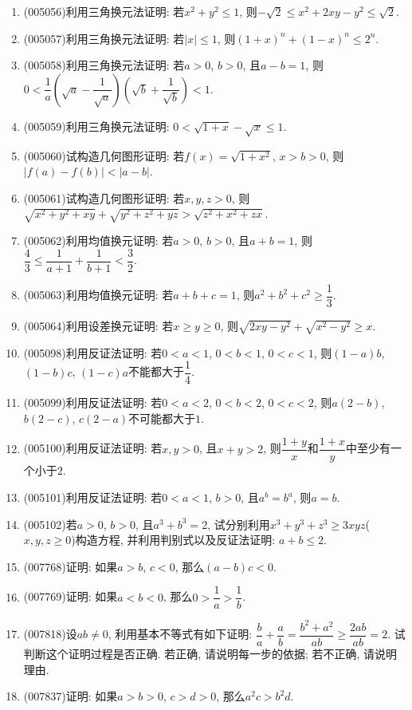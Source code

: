 \documentclass[10pt,a4paper]{article}
\begin{document}
\begin{enumerate}[1.]
\item {\tiny (005056)}利用三角换元法证明: 若$x^2+y^2\le 1$, 则$-\sqrt 2\le x^2+2xy-y^2\le \sqrt 2$.
\item {\tiny (005057)}利用三角换元法证明: 若$|x|\le 1$, 则$(1+x)^n+(1-x)^n\le 2^n$.
\item {\tiny (005058)}利用三角换元法证明: 若$a>0$, $b>0$, 且$a-b=1$, 则$0<\dfrac 1a(\sqrt a-\dfrac 1{\sqrt a})(\sqrt b+\dfrac 1{\sqrt b})<1$.
\item {\tiny (005059)}利用三角换元法证明: $0<\sqrt{1+x}-\sqrt x\le 1$.
\item {\tiny (005060)}试构造几何图形证明: 若$f(x)=\sqrt{1+x^2}$, $x>b>0$, 则$|f(a)-f(b)|<|a-b|$.
\item {\tiny (005061)}试构造几何图形证明: 若$x,y,z>0$, 则$\sqrt{x^2+y^2+xy}+\sqrt{y^2+z^2+yz}>\sqrt{z^2+x^2+zx}$.
\item {\tiny (005062)}利用均值换元证明: 若$a>0$, $b>0$, 且$a+b=1$, 则$\dfrac 43\le \dfrac 1{a+1}+\dfrac 1{b+1}<\dfrac 32$.
\item {\tiny (005063)}利用均值换元证明: 若$a+b+c=1$, 则${a^2}+{b^2}+{c^2}\ge \dfrac 13$.
\item {\tiny (005064)}利用设差换元证明: 若$x\ge y\ge 0$, 则$\sqrt{2xy-{y^2}}+\sqrt{x^2-y^2}\ge x$.
\item {\tiny (005098)}利用反证法证明: 若$0<a<1$, $0<b<1$, $0<c<1$, 则$(1-a)b$, $(1-b)c$, $(1-c)a$不能都大于$\dfrac 14$.
\item {\tiny (005099)}利用反证法证明: 若$0<a<2$, $0<b<2$, $0<c<2$, 则$a(2-b)$, $b(2-c)$, $c(2-a)$不可能都大于$1$.
\item {\tiny (005100)}利用反证法证明: 若$x,y>0$, 且$x+y>2$, 则$\dfrac{1+y}x$和$\dfrac{1+x}y$中至少有一个小于$2$.
\item {\tiny (005101)}利用反证法证明: 若$0<a<1$, $b>0$, 且$a^b=b^a$, 则$a=b$.
\item {\tiny (005102)}若$a>0$, $b>0$, 且$a^3+b^3=2$, 试分别利用$x^3+y^3+z^3\ge 3xyz$($x,y,z\ge 0$)构造方程, 并利用判别式以及反证法证明: $a+b\le 2$.
\item {\tiny (007768)}证明: 如果$a>b$, $c<0$, 那么$(a-b)c<0$.
\item {\tiny (007769)}证明: 如果$a<b<0$, 那么$0>\dfrac 1a>\dfrac 1b$.
\item {\tiny (007818)}设$ab\ne 0$, 利用基本不等式有如下证明: $\dfrac ba+\dfrac ab=\dfrac{{b^2}+{a^2}}{ab}\ge \dfrac{2ab}{ab}=2$. 试判断这个证明过程是否正确. 若正确, 请说明每一步的依据; 若不正确, 请说明理由.
\item {\tiny (007837)}证明: 如果$a>b>0$, $c>d>0$, 那么$a^2c>b^2d$.

\end{enumerate}
\end{document}
